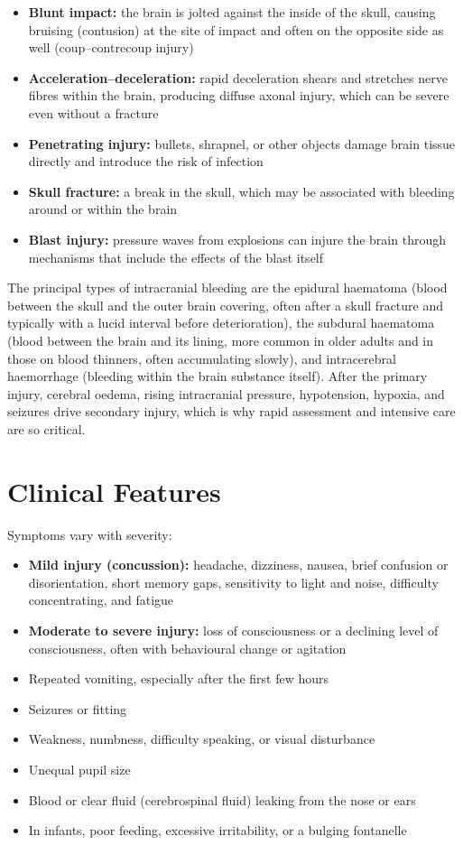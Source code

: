 \begin{itemize}
    \item \textbf{Blunt impact:} the brain is jolted against the inside of the skull, causing bruising (contusion) at the site of impact and often on the opposite side as well (coup--contrecoup injury)
    \item \textbf{Acceleration--deceleration:} rapid deceleration shears and stretches nerve fibres within the brain, producing diffuse axonal injury, which can be severe even without a fracture
    \item \textbf{Penetrating injury:} bullets, shrapnel, or other objects damage brain tissue directly and introduce the risk of infection
    \item \textbf{Skull fracture:} a break in the skull, which may be associated with bleeding around or within the brain
    \item \textbf{Blast injury:} pressure waves from explosions can injure the brain through mechanisms that include the effects of the blast itself
\end{itemize}

The principal types of intracranial bleeding are the epidural haematoma (blood between the skull and the outer brain covering, often after a skull fracture and typically with a lucid interval before deterioration), the subdural haematoma (blood between the brain and its lining, more common in older adults and in those on blood thinners, often accumulating slowly), and intracerebral haemorrhage (bleeding within the brain substance itself). After the primary injury, cerebral oedema, rising intracranial pressure, hypotension, hypoxia, and seizures drive secondary injury, which is why rapid assessment and intensive care are so critical.

\section*{Clinical Features}
Symptoms vary with severity:

\begin{itemize}
    \item \textbf{Mild injury (concussion):} headache, dizziness, nausea, brief confusion or disorientation, short memory gaps, sensitivity to light and noise, difficulty concentrating, and fatigue
    \item \textbf{Moderate to severe injury:} loss of consciousness or a declining level of consciousness, often with behavioural change or agitation
    \item Repeated vomiting, especially after the first few hours
    \item Seizures or fitting
    \item Weakness, numbness, difficulty speaking, or visual disturbance
    \item Unequal pupil size
    \item Blood or clear fluid (cerebrospinal fluid) leaking from the nose or ears
    \item In infants, poor feeding, excessive irritability, or a bulging fontanelle
\end{itemize}

